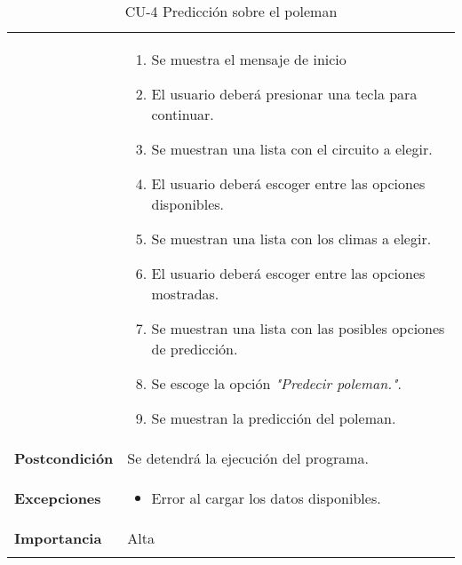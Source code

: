 \begin{longtable}[h!]{@{}ll@{}}
\begin{minipage}[t]{0.23\columnwidth}
\end{minipage} & \begin{minipage}[t]{0.71\columnwidth}\raggedright\strut
\begin{enumerate}
\def\labelenumi{\arabic{enumi}.}
\tightlist
\item 
  Se muestra  el mensaje de inicio
\item
  El usuario deberá presionar una tecla para continuar.
\item
  Se muestran una lista con el circuito a elegir.
\item
  El usuario deberá escoger entre las opciones disponibles.
\item
  Se muestran una lista con los climas a elegir.
\item
  El usuario deberá escoger entre las opciones mostradas.
\item
  Se muestran una lista con las posibles opciones de predicción.
\item
  Se escoge la opción \textit{"Predecir poleman."}.
\item
  Se muestran la predicción del poleman.
\end{enumerate}\strut
\end{minipage}\tabularnewline
\begin{minipage}[t]{0.23\columnwidth}\raggedright\strut
\textbf{Postcondición}\strut
\end{minipage} & \begin{minipage}[t]{0.71\columnwidth}\raggedright\strut
Se detendrá la ejecución del programa.\strut
\end{minipage}\tabularnewline
\begin{minipage}[t]{0.23\columnwidth}\raggedright\strut
\textbf{Excepciones}\strut
\end{minipage} & \begin{minipage}[t]{0.71\columnwidth}\raggedright\strut
\begin{itemize}
\tightlist
\item
  Error al cargar los datos disponibles.
\end{itemize}\strut
\end{minipage}\tabularnewline
\begin{minipage}[t]{0.23\columnwidth}\raggedright\strut
\textbf{Importancia}\strut
\end{minipage} & \begin{minipage}[t]{0.71\columnwidth}\raggedright\strut
Alta\strut
\end{minipage}\tabularnewline
\bottomrule
\caption{CU-4 Predicción sobre el poleman}
\end{longtable}

